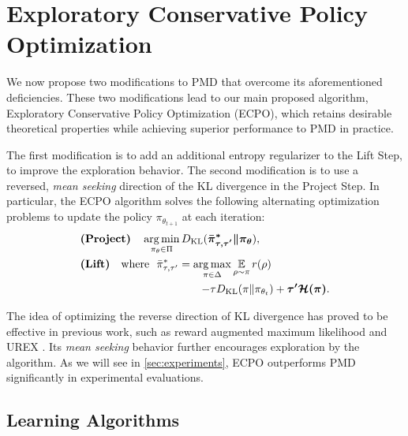 

\section{Exploratory Conservative Policy Optimization}
\label{subsec:ECPO}

We now propose two modifications to PMD that overcome 
its aforementioned deficiencies.
These two modifications lead to our main proposed algorithm,
Exploratory Conservative Policy Optimization (ECPO),
which retains desirable theoretical properties while achieving superior performance to PMD in practice.

The first modification is to add an additional entropy regularizer
to the Lift Step,
to improve the exploration behavior. %
The second modification is to use a reversed, \emph{mean seeking} direction
of the KL divergence in the Project Step.
In particular, the ECPO algorithm solves the following 
alternating
optimization problems to update the policy $\pi_{\theta_{t+1}}$
at each iteration:
%
{\small
\begin{equation}
\label{eq:ECPO}
\begin{split}
&\text{\bf (Project)} \quad  \argmin\limits_{\pi_\theta \in \Pi}{\KL(\bm{ \bar{\pi}_{\tau,\tau^{\prime}}^* \| \pi_\theta }) }, \\
&\text{\bf (Lift)} \quad \text{where}\ \ \bar{\pi}_{\tau,\tau^{\prime}}^*  =  \argmax\limits_{\pi \in \Delta}{ \ep\limits_{\rho \sim \pi}{  r(\rho) }} \\
&\qquad \qquad \qquad \qquad \qquad \quad {{ - \tau \KL(\pi \| \pi_{\theta_t}) + \bm{\tau^{\prime} \cH(\pi)} }}.
\end{split}
\end{equation}
}
%

The idea of optimizing the reverse direction of KL divergence has proved
to be effective in previous work,
such as reward augmented maximum likelihood \citep{norouzi2016reward}
and UREX \citep{nachum2017improving}.
Its \emph{mean seeking} behavior further encourages exploration by the
algorithm.
As we will see in \cref{sec:experiments},
ECPO outperforms PMD significantly in experimental evaluations.

\subsection{Learning Algorithms}


